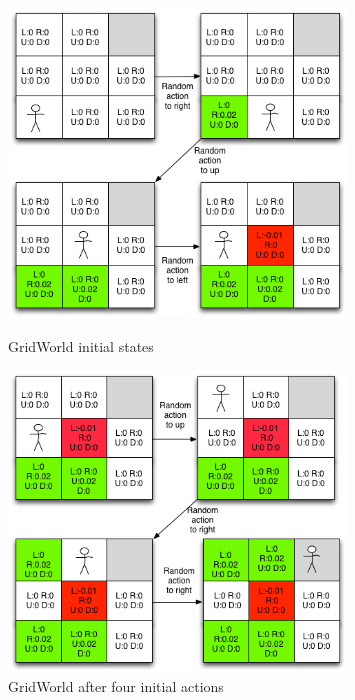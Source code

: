 \begin{figure}[h!]
\centering
\includegraphics[width=0.8\textwidth]{./images/mdpgrid1.png}
\caption{GridWorld initial states}
\label{fig:gridworld1}
\centering
\includegraphics[width=0.8\textwidth]{./images/mdpgrid1-2.png}
\caption{GridWorld after four initial actions}
\label{fig:gridworld2}
\end{figure}




